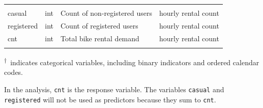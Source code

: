 \documentclass[11pt,letterpaper]{article}
\newcommand{\catmark}{\textsuperscript{\ensuremath{\dagger}}}
\begin{document}
\begin{longtable}{@{}>{\raggedright\arraybackslash}p{} >{\raggedright\arraybackslash}p{} >{\raggedright\arraybackslash}p{} >{\raggedright\arraybackslash}p{}@{}}
\multicolumn{4}{@{}l}{\textbf{Demand Variables}} \\
\addlinespace[0.2em]
casual & int & Count of non-registered users & hourly rental count \\
registered & int & Count of registered users & hourly rental count \\
cnt & int & Total bike rental demand & hourly rental count \\
\addlinespace[1em]
\end{longtable}
\noindent\footnotesize \catmark\ indicates categorical variables, including binary indicators and ordered calendar codes.
\endgroup

In the analysis, \texttt{cnt} is the response variable. The variables \texttt{casual} and \texttt{registered} will not be used as predictors because they sum to \texttt{cnt}.
\end{document}

